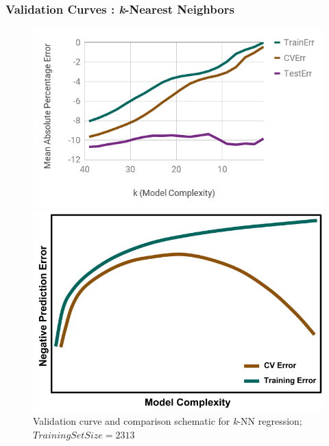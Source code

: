 \begin{frame}
  \frametitle{Validation Curves : \textit{k}-Nearest Neighbors}
  \begin{figure}
    \begin{minipage}{0.65\textwidth}
      \centering
      \includegraphics[width=\linewidth]{./figures/nn-valid.png}
    \end{minipage}%
    \begin{minipage}{0.4\textwidth}
      \centering
      \includegraphics[width=\linewidth]{./figures/NegValidCurve.png}
    \end{minipage}
    \caption{Validation curve and comparison schematic for \textit{k}-NN regression; $Training Set Size=2313$}
  \end{figure}
\end{frame}

